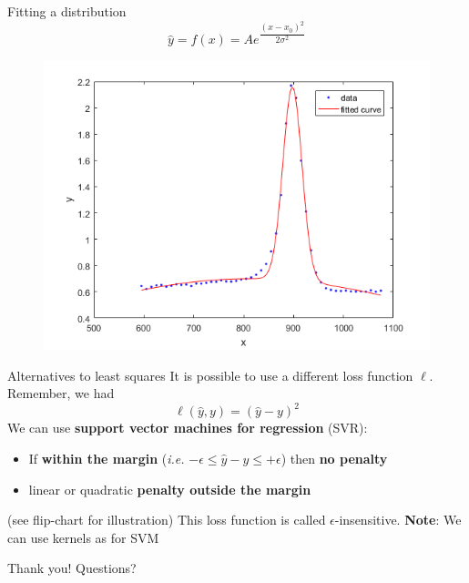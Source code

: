 \documentclass{beamer}
\begin{document}
\begin{frame}{Fitting a distribution}
$$ \hat{y} = f(x) =  A e^{\dfrac{\left( x - x_0 \right)^2}{2\sigma^2}}$$
\begin{figure}
\centering
\includegraphics[width=\textwidth]{images/fitted_gaussian.png}
\end{figure}
\end{frame}

\begin{frame}{Alternatives to least squares}
It is possible to use a different loss function $\ell$. Remember, we had
$$ \ell \left( \hat{y}, y \right) = \left( \hat{y} - y\right)^2$$
\vfill
\pause
We can use \textbf{support vector machines for regression} (SVR):
\begin{itemize}
	\item If \textbf{within the margin} (\textit{i.e.} $ - \epsilon \leq \hat{y} - y \leq + \epsilon$) then \textbf{no penalty}
	\item linear or quadratic \textbf{penalty outside the margin}
\end{itemize}
(see flip-chart for illustration) 
\vfill
This loss function is called $\epsilon$-insensitive.
\pause
\vfill
\textbf{Note}: We can use kernels as for SVM
\end{frame}

\begin{frame}
\begin{center}
\Huge{Thank you! Questions?}
\end{center}
\end{frame}
\end{document}
